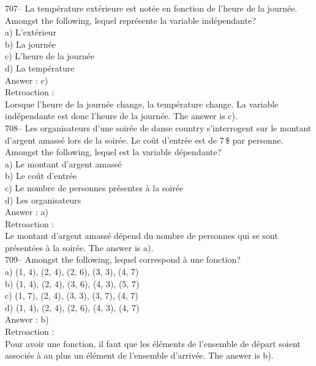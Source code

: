 ﻿\documentclass[letterpaper, 12pt]{article}
\begin{document}
707-- La temp\'erature ext\'erieure est not\'ee en fonction de l'heure de la
journ\'ee.  Amongst the following, lequel repr\'esente la variable
ind\'ependante?\\
a) L'ext\'erieur\\
b) La journ\'ee\\
c) L'heure de la journ\'ee\\
d) La temp\'erature\\

Answer :  c)\\

Retroaction : \\
Lorsque l'heure de la journ\'ee change, la temp\'erature change.  La
variable ind\'ependante est donc l'heure de la journ\'ee.  The answer is
c).\\

708-- Les organisateurs d'une soir\'ee de danse country s'interrogent sur le
montant d'argent amass\'e lors de la soir\'ee.  Le co\^ut d'entr\'ee est de
7\,\$ par personne.  Amongst the following, lequel est la variable
d\'ependante?\\
a) Le montant d'argent amass\'e\\
b) Le co\^ut d'entr\'ee\\
c) Le nombre de personnes pr\'esentes \`a la soir\'ee\\
d) Les organisateurs\\

Answer :  a)\\

Retroaction :  \\
Le montant d'argent amass\'e d\'epend du nombre de personnes qui se sont
pr\'esent\'ees \`a la soir\'ee.  The answer is a).\\

709-- Amongst the following, lequel correspond \`a une fonction?\\
a) {(1, 4), (2, 4), (2, 6), (3, 3), (4, 7)}\\
b) {(1, 4), (2, 4), (3, 6), (4, 3), (5, 7)}\\
c) {(1, 7), (2, 4), (3, 3), (3, 7), (4, 7)}\\
d) {(1, 4), (2, 4), (2, 6), (4, 3), (4, 7)}\\

Answer :  b)\\

Retroaction :  \\
Pour avoir une fonction, il faut que  les \'el\'ements de l'ensemble de
d\'epart soient associ\'es \`a au plus un \'el\'ement de l'ensemble
d'arriv\'ee.  The answer is b).\\
\end{document}
